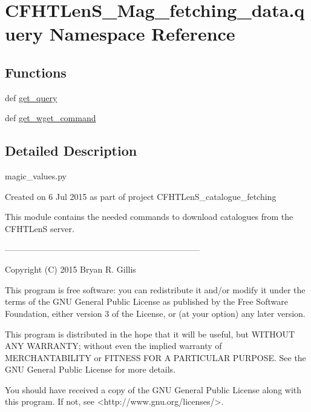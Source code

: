 \hypertarget{namespaceCFHTLenS__Mag__fetching__data_1_1query}{\section{C\-F\-H\-T\-Len\-S\-\_\-\-Mag\-\_\-fetching\-\_\-data.\-query Namespace Reference}
\label{namespaceCFHTLenS__Mag__fetching__data_1_1query}
}
\subsection*{Functions}
\begin{DoxyCompactItemize}
\item 
def \hyperlink{namespaceCFHTLenS__Mag__fetching__data_1_1query_a3882fe7789e268642082f5b67ed69d70}{get\-\_\-query}
\item 
def \hyperlink{namespaceCFHTLenS__Mag__fetching__data_1_1query_ae94c83eb0bd94f9d97cdc92a4ac44da0}{get\-\_\-wget\-\_\-command}
\end{DoxyCompactItemize}


\subsection{Detailed Description}
\begin{DoxyVerb}magic_values.py

    Created on 6 Jul 2015 as part of project CFHTLenS_catalogue_fetching
    
    This module contains the needed commands to download catalogues from
    the CFHTLenS server.

    ---------------------------------------------------------------------

    Copyright (C) 2015  Bryan R. Gillis

    This program is free software: you can redistribute it and/or modify
     it under the terms of the GNU General Public License as published by
     the Free Software Foundation, either version 3 of the License, or
     (at your option) any later version.

     This program is distributed in the hope that it will be useful,
     but WITHOUT ANY WARRANTY; without even the implied warranty of
     MERCHANTABILITY or FITNESS FOR A PARTICULAR PURPOSE.  See the
     GNU General Public License for more details.

    You should have received a copy of the GNU General Public License
    along with this program.  If not, see <http://www.gnu.org/licenses/>.\end{DoxyVerb}
 

